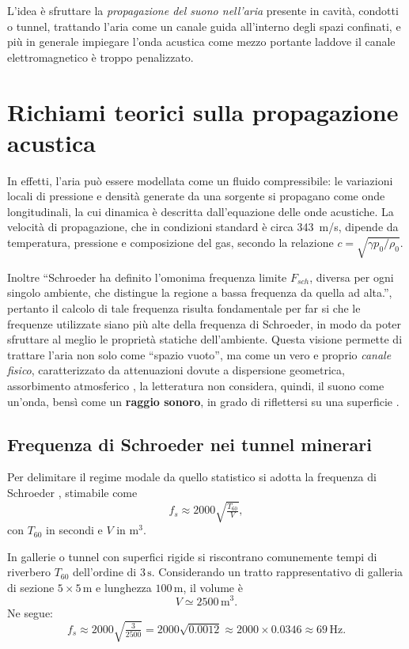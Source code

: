 L’idea è sfruttare la \emph{propagazione del suono nell’aria} presente in cavità, condotti o tunnel, trattando l’aria 
come un canale guida all'interno degli spazi confinati, e più in generale impiegare l’onda acustica come 
mezzo portante laddove il canale elettromagnetico è troppo penalizzato. 

\section{Richiami teorici sulla propagazione acustica}
In effetti, l’aria può essere modellata come un fluido compressibile: le variazioni locali di pressione e densità generate da una sorgente si propagano come onde longitudinali, 
la cui dinamica è descritta dall’equazione delle onde acustiche. 
La velocità di propagazione, che in condizioni standard 
è circa \SI{343}{m/s}, dipende da temperatura, pressione e composizione del gas, secondo la relazione 
$c = \sqrt{\gamma p_0 / \rho_0}$. 



Inoltre \enquote{Schroeder ha definito l'omonima frequenza limite $F_{sch}$,
diversa per ogni singolo ambiente, che distingue la regione a bassa frequenza
da quella ad alta.}\citep[pp.~1]{bianchi2023spazio}, pertanto il calcolo di tale frequenza 
risulta fondamentale per far si che le frequenze utilizzate siano più alte della frequenza di Schroeder,
 in modo da poter sfruttare al meglio le proprietà statiche dell'ambiente.
 Questa visione permette di trattare l’aria non solo come “spazio vuoto”, ma come un 
vero e proprio \emph{canale fisico}, caratterizzato da attenuazioni dovute a dispersione geometrica, assorbimento atmosferico 
, la letteratura non considera, quindi, il suono come un'onda, bensì come un \textbf{raggio sonoro}, in grado di riflettersi su una 
superficie \citep[pp.~3--4]{bianchi2023spazio}.

\newpage
\subsection*{Frequenza di Schroeder nei tunnel minerari}

Per delimitare il regime modale da quello statistico si adotta la frequenza di Schroeder \citep[p.~1]{bianchi2023spazio}, stimabile come
\[
f_s \approx 2000 \sqrt{\tfrac{T_{60}}{V}},
\]
con $T_{60}$ in secondi e $V$ in m$^3$.  

In gallerie o tunnel con superfici rigide si riscontrano comunemente tempi di riverbero $T_{60}$ dell’ordine di $3\,\text{s}$.  
Considerando un tratto rappresentativo di galleria di sezione $5 \times 5 \,\text{m}$ e lunghezza $100\,\text{m}$, il volume è
\[
V \simeq 2500 \,\text{m}^3.
\]
Ne segue:
\[
f_s \approx 2000 \sqrt{\tfrac{3}{2500}}
= 2000 \sqrt{0.0012}
\approx 2000 \times 0.0346
\approx 69 \,\text{Hz}.
\]

